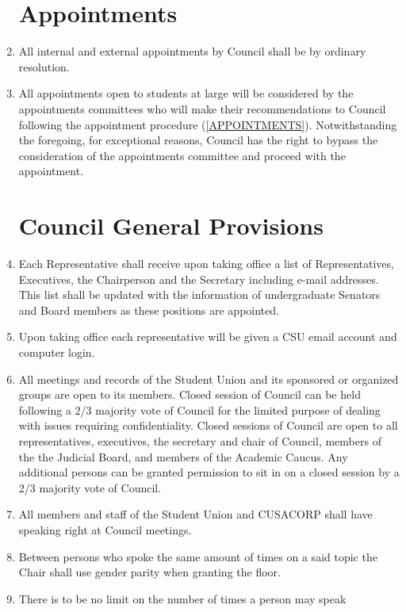 \documentclass[oneside]{book}
\begin{document}
\begin{enumerate}
\chapter{\label{Appointments}Appointments }
\item All internal and external appointments by Council shall be by ordinary
resolution. 
\item All appointments open to students at large will be considered by the
appointments committees who will make their recommendations to Council
following the appointment procedure (\autoref{APPOINTMENTS}). Notwithstanding the
foregoing, for exceptional reasons, Council has the right to bypass
the consideration of the appointments committee and proceed with the
appointment. 

\chapter{\label{Council_General_Provisions}Council General Provisions }
\item Each Representative shall receive upon taking office a list of Representatives,
Executives, the Chairperson and the Secretary including e-mail addresses. This list 
shall be updated with the information of undergraduate Senators and Board members as 
these positions are appointed.
\item Upon taking office each representative will be given a CSU email account
and computer login. 
\item All meetings and records of the Student Union and its sponsored or
organized groups are open to its members. Closed session of Council
can be held following a 2/3 majority vote of Council for the limited
purpose of dealing with issues requiring confidentiality. Closed sessions of Council are open to 
all representatives, executives, the secretary and chair of Council, members of the the Judicial 
Board, and members of the Academic Caucus. Any additional persons can be granted permission to 
sit in on a closed session by a 2/3 majority vote of Council.
\item All members and staff of the Student Union and CUSACORP shall have
speaking right at Council meetings. 
\item Between persons who spoke the same amount of times on a said topic
the Chair shall use gender parity when granting the floor. 
\item There is to be no limit on the number of times a person may speak

\end{enumerate}
\end{document}
